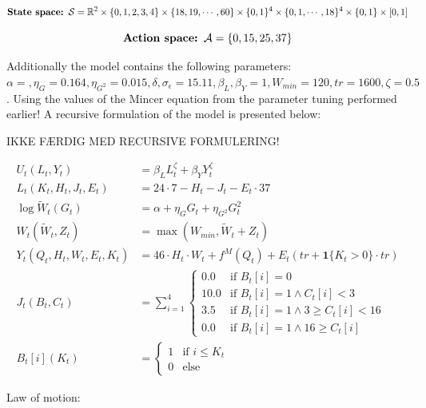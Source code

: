 \begin{equation}
    \textbf{State space: }\mathcal{S} = \mathbb{R}^2 \times \{0, 1, 2, 3, 4\} \times \{18, 19, \cdots , 60\} \times \{0, 1\}^4 \times \{0, 1, \cdots, 18\}^4 \times \{0,1\} \times [0, 1]
\end{equation}

\begin{equation}
    \textbf{Action space: }\mathcal{A} = \{0, 15, 25, 37\}
\end{equation}

Additionally the model contains the following parameters: $\alpha=, \eta_G = 0.164, \eta_{G^{2}}=0.015, \delta, \sigma_\epsilon = 15.11, \beta_L, \beta_Y = 1, W_{min} = 120, tr = 1600, \zeta=0.5$. Using the values of the Mincer equation from the parameter tuning performed earlier! A recursive formulation of the model is presented below:


IKKE FÆRDIG MED RECURSIVE FORMULERING!

\begin{align}
    U_t(L_t, Y_t) &= \beta_L L_t^{\zeta} + \beta_Y Y_t^{\zeta}\\
    L_t(K_t, H_t, J_t, E_t) &= 24 \cdot 7 - H_t - J_t - E_t \cdot 37\\
    \log \tilde{W}_t (G_t) &= \alpha + \eta_G G_t + \eta_{G^2} G_t^2 \\
    W_t(\tilde{W}_t, Z_t) &= \max(W_{min} , \tilde{W}_t  + Z_t)  \\
    Y_t(Q_t,H_t, W_t, E_t, K_t) &= 46 \cdot H_t \cdot W_t + f^M(Q_t) +  E_t (tr + \mathbf{1} \{ K_t > 0 \} \cdot tr)\\
    J_t (B_t, C_t) &= \sum_{i=1}^4 \begin{cases}
        0.0 & \text{if } B_t[i] = 0 \\
        10.0 & \text{if } B_t[i] = 1 \land C_t[i] < 3 \\
        3.5 & \text{if } B_t[i] = 1 \land 3 \geq C_t[i] < 16 \\
        0.0 & \text{if } B_t[i] = 1 \land  16 \geq  C_t[i] 
    \end{cases} \\
    B_t[i] (K_t) &= \begin{cases}
        1 & \text{if }  i \leq K_t \\
        0 & \text{else}
    \end{cases}
\end{align}

Law of motion:

